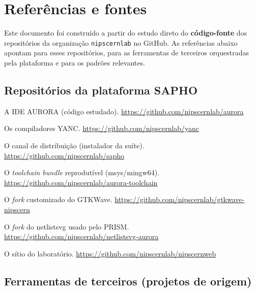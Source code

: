 \chapter{Referências e fontes}
\label{ap:referencias}

Este documento foi construído a partir do estudo direto do \textbf{código-fonte} dos repositórios
da organização \texttt{nipscernlab} no GitHub. As referências abaixo apontam para esses
repositórios, para as ferramentas de terceiros orquestradas pela plataforma e para os padrões
relevantes.

\section{Repositórios da plataforma SAPHO}

\begin{description}[style=nextline,leftmargin=0pt]
\item[\repo{aurora}] A IDE AURORA (código estudado).
\url{https://github.com/nipscernlab/aurora}
\item[\repo{yanc}] Os compiladores YANC.
\url{https://github.com/nipscernlab/yanc}
\item[\repo{sapho}] O canal de distribuição (instalador da suíte).
\url{https://github.com/nipscernlab/sapho}
\item[\repo{aurora-toolchain}] O \textit{toolchain bundle} reprodutível (msys/mingw64).
\url{https://github.com/nipscernlab/aurora-toolchain}
\item[\repo{gtkwave-nipscern}] O \textit{fork} customizado do GTKWave.
\url{https://github.com/nipscernlab/gtkwave-nipscern}
\item[\repo{netlistsvg-aurora}] O \textit{fork} do netlistsvg usado pelo PRISM.
\url{https://github.com/nipscernlab/netlistsvg-aurora}
\item[\repo{nipscernweb}] O sítio do laboratório.
\url{https://github.com/nipscernlab/nipscernweb}
\end{description}

\section{Ferramentas de terceiros (projetos de origem)}

